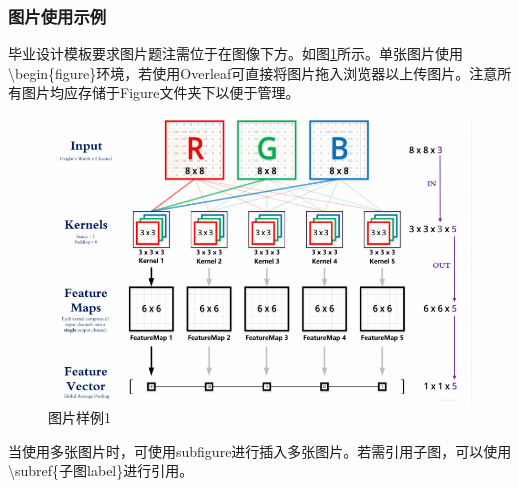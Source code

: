 \begin{thesischapter}
    \subsubsection{图片使用示例}
     毕业设计模板要求图片题注需位于在图像下方。如图\ref{fig:sample_1}所示。单张图片使用\textbackslash begin\{figure\}环境，若使用Overleaf可直接将图片拖入浏览器以上传图片。注意所有图片均应存储于Figure文件夹下以便于管理。\par
    \begin{figure}[hb]
        \centering
        \includegraphics[width=0.4\linewidth]{Figure/sample_1.png}
        \caption{图片样例1}
        \label{fig:sample_1}
    \end{figure}
    当使用多张图片时，可使用subfigure进行插入多张图片。若需引用子图，可以使用\textbackslash subref\{子图label\}进行引用。
    \begin{figure}[h]
        \centering
        \hfill
        \subfigure[下采样模块]
        {
            \centering
}
\end{figure}
\end{thesischapter}
